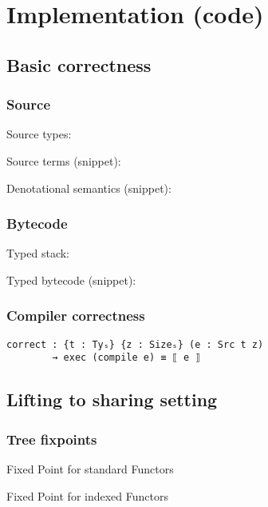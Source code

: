 \section{Implementation (code)}

    \subsection{Basic correctness}

        \begin{frame}[fragile]
            \frametitle{Source}

            Source types:

            Source terms (snippet):

            Denotational semantics (snippet):
\end{frame}

        \begin{frame}[fragile]
            \frametitle{Bytecode}

            Typed stack:

            Typed bytecode (snippet):
\end{frame}

        \begin{frame}[fragile]
            \frametitle{Compiler correctness}
            \begin{verbatim}
correct : {t : Tyₛ} {z : Sizeₛ} (e : Src t z)
        → exec (compile e) ≡ ⟦ e ⟧
            \end{verbatim}
\end{frame}


    \subsection{Lifting to sharing setting}
        \begin{frame}[fragile]
            \frametitle{Tree fixpoints}
            Fixed Point for standard Functors
            
            Fixed Point for indexed Functors
\end{frame}


